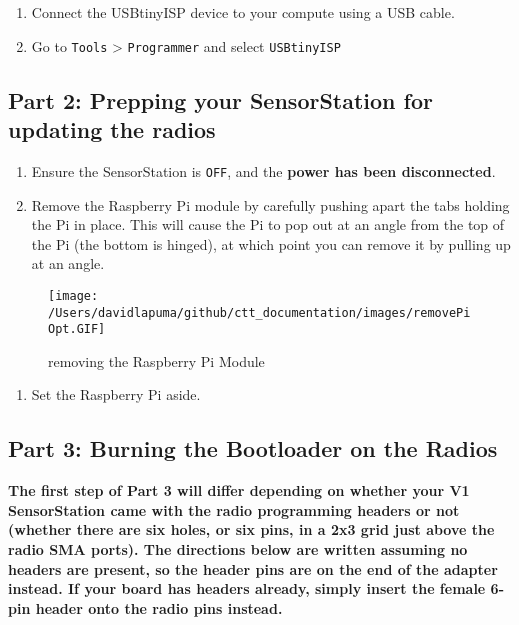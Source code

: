 \documentclass[
]{article}
\providecommand{\tightlist}{%
  \setlength{\itemsep}{0pt}\setlength{\parskip}{0pt}}
\begin{document}
\begin{enumerate}
\def\labelenumi{\arabic{enumi}.}
\setcounter{enumi}{5}
\item
  Connect the USBtinyISP device to your compute using a USB cable.
\item
  Go to \texttt{Tools} \textgreater{} \texttt{Programmer} and select
  \texttt{USBtinyISP}
\end{enumerate}

\hypertarget{part-2-prepping-your-sensorstation-for-updating-the-radios}{%
\subsection{Part 2: Prepping your SensorStation for updating the
radios}\label{part-2-prepping-your-sensorstation-for-updating-the-radios}}

\begin{enumerate}
\def\labelenumi{\arabic{enumi}.}
\tightlist
\item
  Ensure the SensorStation is \texttt{OFF}, and the \textbf{power has
  been disconnected}.
\item
  Remove the Raspberry Pi module by carefully pushing apart the tabs
  holding the Pi in place. This will cause the Pi to pop out at an angle
  from the top of the Pi (the bottom is hinged), at which point you can
  remove it by pulling up at an angle.
\end{enumerate}

\begin{figure}
\hypertarget{id}{%
\centering
\texttt{[image: /Users/davidlapuma/github/ctt\_documentation/images/removePiOpt.GIF]}
\caption{removing the Raspberry Pi Module}\label{id}
}
\end{figure}

\begin{enumerate}
\def\labelenumi{\arabic{enumi}.}
\setcounter{enumi}{2}
\tightlist
\item
  Set the Raspberry Pi aside.
\end{enumerate}

\hypertarget{part-3-burning-the-bootloader-on-the-radios}{%
\subsection{Part 3: Burning the Bootloader on the
Radios}\label{part-3-burning-the-bootloader-on-the-radios}}

\textbf{The first step of Part 3 will differ depending on whether your
V1 SensorStation came with the radio programming headers or not (whether
there are six holes, or six pins, in a 2x3 grid just above the radio SMA
ports). The directions below are written assuming no headers are
present, so the header pins are on the end of the adapter instead. If
your board has headers already, simply insert the female 6-pin header
onto the radio pins instead.}
\end{document}
